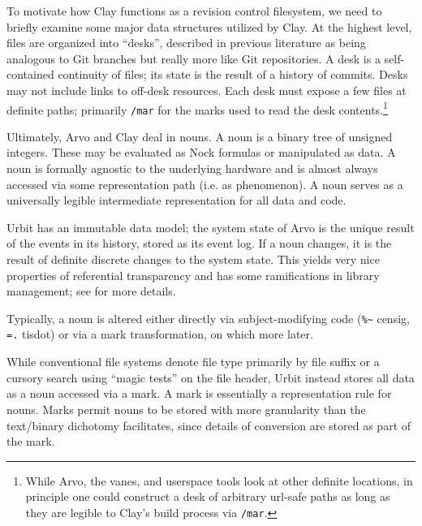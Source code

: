 \documentclass[twoside]{article}
\begin{document}
To motivate how Clay functions as a revision control filesystem, we need to briefly examine some major data structures utilized by Clay.  At the highest level, files are organized into “desks”, described in previous literature as being analogous to Git branches but really more like Git repositories.  A desk is a self-contained continuity of files; its state is the result of a history of commits.  Desks may not include links to off-desk resources.  Each desk must expose a few files at definite paths; primarily \lstinline[style=inlinecode]{/mar} for the marks used to read the desk contents.\footnote{While Arvo, the vanes, and userspace tools look at other definite locations, in principle one could construct a desk of arbitrary {\sc url}-safe paths as long as they are legible to Clay's build process via \lstinline[style=inlinecode]{/mar}.}

Ultimately, Arvo and Clay deal in nouns.  A noun is a binary tree of unsigned integers.  These may be evaluated as Nock formulas or manipulated as data.  A noun is formally agnostic to the underlying hardware and is almost always accessed via some representation path (i.e. as phenomenon).  A noun serves as a universally legible intermediate representation for all data and code.

Urbit has an immutable data model; the system state of Arvo is the unique result of the events in its history, stored as its event log.  If a noun changes, it is the result of definite discrete changes to the system state.  This yields very nice properties of referential transparency and has some ramifications in library management; see \citet{Blackman2024a} for more details.

Typically, a noun is altered either directly via subject-modi\-fying code (\lstinline[style=inlinecode]{%~} censig, \lstinline[style=inlinecode]{=.} tisdot) or via a mark transformation, on which more later.

While conventional file systems denote file type primarily by file suffix or a cursory search using “magic tests” on the file header, Urbit instead stores all data as a noun accessed via a mark.  A mark is essentially a representation rule for nouns.  Marks permit nouns to be stored with more granularity than the text/binary dichotomy facilitates, since details of conversion are stored as part of the mark.
\end{document}
